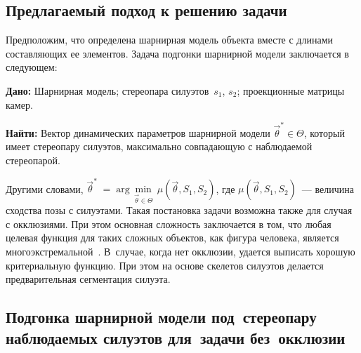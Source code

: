 \begin{multicols}{2}
\subsection{Предлагаемый подход к решению задачи} %
     
     Предположим, что определена шарнирная модель объекта вместе с 
длинами составляющих ее элементов. Задача подгонки шарнирной модели 
заключается в следующем:
     
     \textbf{Дано:} Шарнирная модель; стереопара силуэтов~$s_1$, $s_2$; 
проекционные матрицы камер.
     
     \textbf{Найти:} Вектор динамических параметров шарнирной модели 
$\vec{\theta}^*\in\Theta$, который имеет стереопару силуэтов, максимально 
совпадающую с наблю\-да\-емой стереопарой. 
     
     Другими словами, $\vec{\theta}^*\;=\;\mathrm{arg}\,\underset{\vec\theta \in 
\Theta}{\min}\,\mu (\vec\theta, S_1, S_2)$, где $\mu(\vec\theta, S_1, S_2)$~--- 
величина сходства позы с силуэтами. Такая постановка задачи возможна также 
для случая с окклюзиями. При этом основная сложность заключается в том, что 
любая целевая функция для таких сложных объектов, как фигура человека, 
является многоэкстремальной~\cite{9ts}. В~случае, когда нет окклюзии, 
удается выписать хорошую критериальную функцию. При этом на основе 
скелетов силуэтов делается предварительная сегментация силуэта. 

\subsection{Подгонка шарнирной модели под~стереопару наблюдаемых 
силуэтов для~задачи без~окклюзии } %
     

\end{multicols}
